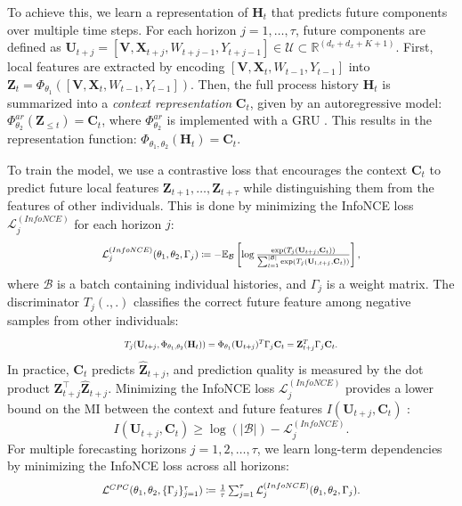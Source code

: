 \documentclass{article}
\theoremstyle{plain}
\theoremstyle{definition}
\theoremstyle{remark}
\begin{document}
To achieve this, we learn a representation of $\mathbf{H}_t$ that predicts future components over multiple time steps. For each horizon $j = 1, \dots, \tau$, future components are defined as $\mathbf{U}_{t+j} = [\mathbf{V}, \mathbf{X}_{t+j}, W_{t+j-1}, Y_{t+j-1}] \in \mathcal{U} \subset \mathbb{R}^{(d_v+d_x+K+1)}$. First, local features are extracted by encoding $[\mathbf{V}, \mathbf{X}_{t}, W_{t-1}, Y_{t-1}]$ into $\mathbf{Z}_t = \Phi_{\theta_1}([\mathbf{V}, \mathbf{X}_{t}, W_{t-1}, Y_{t-1}])$. Then, the full process history $\mathbf{H}_t$ is summarized into a \emph{context representation} $\mathbf{C}_t$, given by an autoregressive model: $\Phi_{\theta_2}^{ar}(\mathbf{Z}_{\leq t}) = \mathbf{C}_t$, where $\Phi_{\theta_2}^{ar}$ is implemented with a GRU \citep{cho2014GRU}. This results in the representation function: $\Phi_{\theta_1, \theta_2}(\mathbf{H}_t) = \mathbf{C}_t$.

To train the model, we use a contrastive loss that encourages the context $\mathbf{C}_t$ to predict future local features $\mathbf{Z}_{t+1}, \dots, \mathbf{Z}_{t+\tau}$ while distinguishing them from the features of other individuals. This is done by minimizing the InfoNCE loss $\mathcal{L}^{(InfoNCE)}_j$ for each horizon $j$:
\begin{equation}
\label{eq: infonce_loss_cpc}
\resizebox{0.6\textwidth}{!}{$
\mathcal{L}^{(InfoNCE)}_j(\theta_1, \theta_2, \Gamma_j) \coloneqq -\mathbb{E}_{\mathcal{B}} \left[ \log \frac{\exp(T_j(\mathbf{U}_{t+j}, \mathbf{C}_t))}{\sum_{l=1}^{|\mathcal{B}|} \exp(T_j(\mathbf{U}_{l,t+j},\mathbf{C}_t))} \right],
$}
\end{equation}
where $\mathcal{B}$ is a batch containing individual histories, and $\Gamma_j$ is a weight matrix. The discriminator $T_j(.,.)$ classifies the correct future feature among negative samples from other individuals:
\begin{equation}
\label{eq: discrim_cpc}
\resizebox{0.5\textwidth}{!}{$
T_j(\mathbf{U}_{t+j}, \Phi_{\theta_1, \theta_2}(\mathbf{H}_t)) = \Phi_{\theta_1}(\mathbf{U}_{t+j})^T \Gamma_j \mathbf{C}_t = \mathbf{Z}_{t+j}^T \Gamma_j \mathbf{C}_t.
$}
\end{equation}
In practice, $\mathbf{C}_t$ predicts $\mathbf{\hat{Z}}_{t+j}$, and prediction quality is measured by the dot product $\mathbf{Z}_{t+j}^\top \mathbf{\hat{Z}}_{t+j}$. Minimizing the InfoNCE loss $\mathcal{L}^{(InfoNCE)}_j$ provides a lower bound on the MI between the context and future features $I(\mathbf{U}_{t+j}, \mathbf{C}_{t})$ \citep{oord2018representation}:
\begin{equation}
 \label{eq: LB_MI_InfoNCE}
    I(\mathbf{U}_{t+j}, \mathbf{C}_{t}) \geq \log(|\mathcal{B}|) - \mathcal{L}^{(InfoNCE)}_j.
\end{equation}
For multiple forecasting horizons $j = 1, 2, \dots, \tau$, we learn long-term dependencies by minimizing the InfoNCE loss across all horizons:
\begin{equation}
    \label{eq: cpc_loss}
    \resizebox{0.6\textwidth}{!}{$\mathcal{L}^{CPC}(\theta_1, \theta_2, \{\Gamma_j\}_{j=1}^{\tau}) \coloneqq \frac{1}{\tau} \sum_{j=1}^{\tau} \mathcal{L}^{(InfoNCE)}_j(\theta_1, \theta_2, \Gamma_j).$}
\end{equation}
\end{document}
